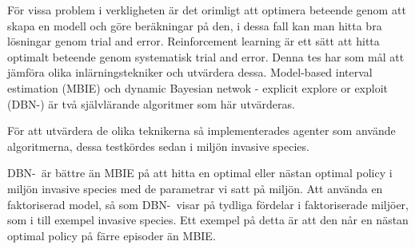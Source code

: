 För vissa problem i verkligheten är det orimligt att optimera beteende genom att skapa en modell och göre beräkningar på den, i dessa fall kan man hitta bra lösningar genom trial and error. Reinforcement learning är ett sätt att hitta optimalt beteende genom systematisk trial and error.
Denna tes har som mål att jämföra olika inlärningstekniker och utvärdera dessa.
Model-based interval estimation (MBIE) och dynamic Bayesian netwok - explicit explore or exploit (DBN-\etre) är 
två självlärande algoritmer som här utvärderas.

För att utvärdera de olika teknikerna så implementerades agenter som använde algoritmerna, dessa testkördes sedan 
i miljön invasive species.

DBN-\etre\ är bättre än MBIE på att hitta en optimal eller nästan optimal policy i miljön invasive species med de parametrar vi satt på miljön.
Att använda en faktoriserad model, så som DBN-\etre\, visar på tydliga fördelar i faktoriserade miljöer, som i till exempel invasive species. 
Ett exempel på detta är att den når en nästan optimal policy på färre episoder än MBIE.





